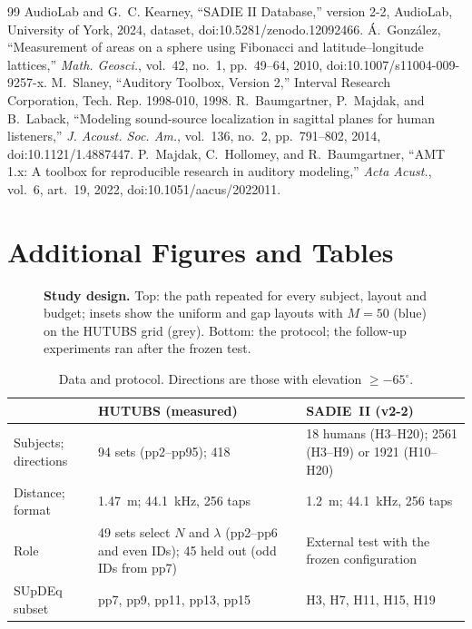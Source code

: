 \documentclass[11pt,a4paper]{article}
\begin{document}
\begin{thebibliography}{99}
 AudioLab and G.~C. Kearney, ``SADIE II Database,'' version 2-2, AudioLab, University of York, 2024, dataset, doi:10.5281/zenodo.12092466.
 \'A.~Gonz\'alez, ``Measurement of areas on a sphere using Fibonacci and latitude--longitude lattices,'' \emph{Math. Geosci.}, vol.~42, no.~1, pp.~49--64, 2010, doi:10.1007/s11004-009-9257-x.
 M.~Slaney, ``Auditory Toolbox, Version 2,'' Interval Research Corporation, Tech. Rep. 1998-010, 1998.
 R.~Baumgartner, P.~Majdak, and B.~Laback, ``Modeling sound-source localization in sagittal planes for human listeners,'' \emph{J. Acoust. Soc. Am.}, vol.~136, no.~2, pp.~791--802, 2014, doi:10.1121/1.4887447.
 P.~Majdak, C.~Hollomey, and R.~Baumgartner, ``AMT 1.x: A toolbox for reproducible research in auditory modeling,'' \emph{Acta Acust.}, vol.~6, art.~19, 2022, doi:10.1051/aacus/2022011.
\end{thebibliography}
\endgroup

\appendix
\section{Additional Figures and Tables}
\setcounter{figure}{0}\setcounter{table}{0}
\renewcommand{\thefigure}{A\arabic{figure}}\renewcommand{\thetable}{A\arabic{table}}

\begin{figure}[H]
\centering

\caption{\textbf{Study design.} Top: the path repeated for every subject, layout and budget; insets show the uniform and gap layouts with $M=50$ (blue) on the HUTUBS grid (grey). Bottom: the protocol; the follow-up experiments ran after the frozen test.}
\label{fig:overview}
\end{figure}

\begin{table}[H]
\centering
\caption{Data and protocol. Directions are those with elevation $\ge-65^\circ$.}
\label{tab:data}
\footnotesize
\setlength{\tabcolsep}{5pt}
\begin{tabularx}{\linewidth}{@{}lXX@{}}
\toprule
 & HUTUBS (measured) & SADIE~II (v2-2) \\
\midrule
Subjects; directions & 94 sets (pp2--pp95); 418 & 18 humans (H3--H20); 2561 (H3--H9) or 1921 (H10--H20) \\
Distance; format & 1.47~m; 44.1~kHz, 256 taps & 1.2~m; 44.1~kHz, 256 taps \\
Role & 49 sets select $N$ and $\lambda$ (pp2--pp6 and even IDs); 45 held out (odd IDs from pp7) & External test with the frozen configuration \\
SUpDEq subset & pp7, pp9, pp11, pp13, pp15 & H3, H7, H11, H15, H19 \\
\bottomrule
\end{tabularx}
\end{table}
\end{document}

